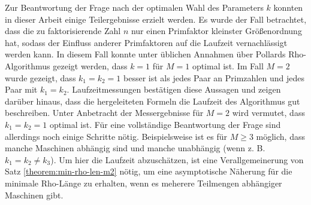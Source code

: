 \documentclass[a4paper, 10pt, ngerman]{article}
\begin{document}
    Zur Beantwortung der Frage nach der optimalen Wahl des Parameters $k$ konnten in dieser Arbeit einige Teilergebnisse erzielt werden. Es wurde der Fall betrachtet, dass die zu faktorisierende Zahl $n$ nur einen Primfaktor kleinster Größenordnung hat, sodass der Einfluss anderer Primfaktoren auf die Laufzeit vernachlässigt werden kann. In diesem Fall konnte unter üblichen Annahmen über Pollards Rho-Algorithmus gezeigt werden, dass $k = 1$ für $M = 1$ optimal ist. Im Fall $M = 2$ wurde gezeigt, dass $k_1 = k_2 = 1$ besser ist als jedes Paar an Primzahlen und jedes Paar mit $k_1 = k_2$. Laufzeitmessungen bestätigen diese Aussagen und zeigen darüber hinaus, dass die hergeleiteten Formeln die Laufzeit des Algorithmus gut beschreiben. Unter Anbetracht der Messergebnisse für $M = 2$ wird vermutet, dass $k_1 = k_2 = 1$ optimal ist. Für eine vollständige Beantwortung der Frage sind allerdings noch einige Schritte nötig. Beispielsweise ist es für $M \ge 3$ möglich, dass manche Maschinen abhängig sind und manche unabhängig (wenn z. B. $k_1 = k_2 \ne k_3$). Um hier die Laufzeit abzuschätzen, ist eine Verallgemeinerung von Satz \ref{theorem:min-rho-len-m2} nötig, um eine asymptotische Näherung für die minimale Rho-Länge zu erhalten, wenn es meherere Teilmengen abhängiger Maschinen gibt.

\newpage
\printbibliography
\end{document}
